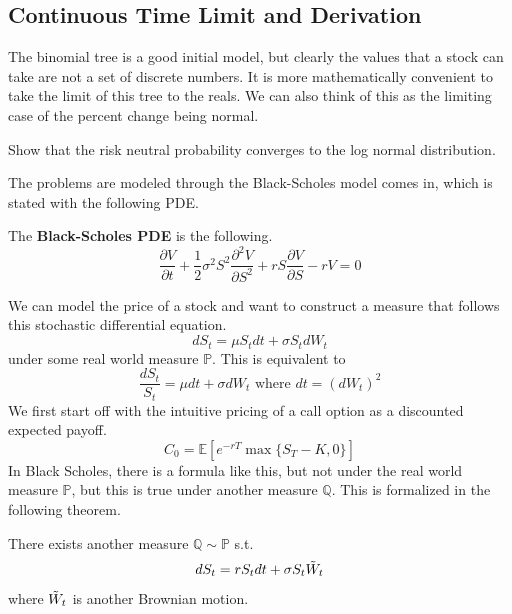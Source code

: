 \documentclass{article}
\begin{document}
  \subsection{Continuous Time Limit and Derivation}

    The binomial tree is a good initial model, but clearly the values that a stock can take are not a set of discrete numbers. It is more mathematically convenient to take the limit of this tree to the reals. We can also think of this as the limiting case of the percent change being normal. 

    \begin{question}[TBD]
      Show that the risk neutral probability converges to the log normal distribution. 
    \end{question}

    The problems are modeled through the Black-Scholes model comes in, which is stated with the following PDE.

    \begin{definition}
      The \textbf{Black-Scholes PDE} is the following. 
      \begin{equation}
        \frac{\partial V}{\partial t} + \frac{1}{2} \sigma^2 S^2 \frac{\partial^2 V}{\partial S^2} + r S \frac{\partial V}{\partial S} - rV = 0
      \end{equation}
    \end{definition}

    We can model the price of a stock and want to construct a measure that follows this stochastic differential equation. 
    \begin{equation}
      dS_t = \mu S_t dt + \sigma S_t dW_t
    \end{equation}
    under some real world measure $\mathbb{P}$. This is equivalent to 
    \begin{equation}
      \frac{d S_t}{S_t} = \mu dt + \sigma d W_t \text{ where } dt = (dW_t)^2
    \end{equation}
    We first start off with the intuitive pricing of a call option as a discounted expected payoff. 
    \begin{equation}
      C_0 = \mathbb{E} [ e^{-r T} \max\{ S_T - K, 0\}]
    \end{equation}
    In Black Scholes, there is a formula like this, but not under the real world measure $\mathbb{P}$, but this is true under another measure $\mathbb{Q}$.  This is formalized in the following theorem. 

    \begin{theorem}
      There exists another measure $\mathbb{Q} \sim \mathbb{P}$ s.t. 
      \begin{equation}
        dS_t = r S_t dt + \sigma S_t \Tilde{W}_t 
      \end{equation}
      where $\Tilde{W}_t$ is another Brownian motion. 
    \end{theorem}
\end{document}
